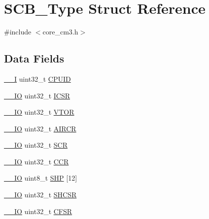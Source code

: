 \hypertarget{structSCB__Type}{}\section{S\+C\+B\+\_\+\+Type Struct Reference}
\label{structSCB__Type}


{\ttfamily \#include $<$core\+\_\+cm3.\+h$>$}

\subsection*{Data Fields}
\begin{DoxyCompactItemize}
\item 
\hyperlink{LPC17xx_8h_af63697ed9952cc71e1225efe205f6cd3}{\+\_\+\+\_\+I} uint32\+\_\+t \hyperlink{structSCB__Type_afa7a9ee34dfa1da0b60b4525da285032}{C\+P\+U\+ID}
\item 
\hyperlink{LPC17xx_8h_aec43007d9998a0a0e01faede4133d6be}{\+\_\+\+\_\+\+IO} uint32\+\_\+t \hyperlink{structSCB__Type_a3e66570ab689d28aebefa7e84e85dc4a}{I\+C\+SR}
\item 
\hyperlink{LPC17xx_8h_aec43007d9998a0a0e01faede4133d6be}{\+\_\+\+\_\+\+IO} uint32\+\_\+t \hyperlink{structSCB__Type_a0faf96f964931cadfb71cfa54e051f6f}{V\+T\+OR}
\item 
\hyperlink{LPC17xx_8h_aec43007d9998a0a0e01faede4133d6be}{\+\_\+\+\_\+\+IO} uint32\+\_\+t \hyperlink{structSCB__Type_a6ed3c9064013343ea9fd0a73a734f29d}{A\+I\+R\+CR}
\item 
\hyperlink{LPC17xx_8h_aec43007d9998a0a0e01faede4133d6be}{\+\_\+\+\_\+\+IO} uint32\+\_\+t \hyperlink{structSCB__Type_abfad14e7b4534d73d329819625d77a16}{S\+CR}
\item 
\hyperlink{LPC17xx_8h_aec43007d9998a0a0e01faede4133d6be}{\+\_\+\+\_\+\+IO} uint32\+\_\+t \hyperlink{structSCB__Type_a6d273c6b90bad15c91dfbbad0f6e92d8}{C\+CR}
\item 
\hyperlink{LPC17xx_8h_aec43007d9998a0a0e01faede4133d6be}{\+\_\+\+\_\+\+IO} uint8\+\_\+t \hyperlink{structSCB__Type_af6336103f8be0cab29de51daed5a65f4}{S\+HP} \mbox{[}12\mbox{]}
\item 
\hyperlink{LPC17xx_8h_aec43007d9998a0a0e01faede4133d6be}{\+\_\+\+\_\+\+IO} uint32\+\_\+t \hyperlink{structSCB__Type_ae9891a59abbe51b0b2067ca507ca212f}{S\+H\+C\+SR}
\item 
\hyperlink{LPC17xx_8h_aec43007d9998a0a0e01faede4133d6be}{\+\_\+\+\_\+\+IO} uint32\+\_\+t \hyperlink{structSCB__Type_a2f94bf549b16fdeb172352e22309e3c4}{C\+F\+SR}
\item 

\end{DoxyCompactItemize}

